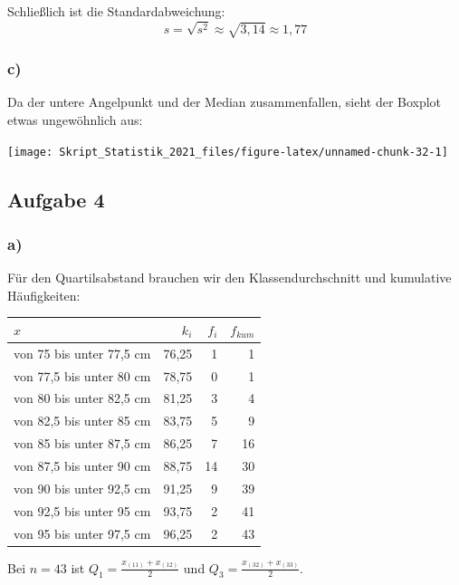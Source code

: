 \documentclass[
  11pt,
  ngerman,
  a4paper,
]{report}
\begin{document}
Schließlich ist die Standardabweichung: \[s=\sqrt{s^2}\approx\sqrt{3,14}\approx1,77\]

\hypertarget{c-4}{%
\subsubsection{c)}\label{c-4}}

Da der untere Angelpunkt und der Median zusammenfallen, sieht der Boxplot etwas ungewöhnlich aus:

\begin{center}\texttt{[image: Skript\_Statistik\_2021\_files/figure-latex/unnamed-chunk-32-1]} \end{center}

\hypertarget{aufgabe-4-3}{%
\subsection{Aufgabe 4}\label{aufgabe-4-3}}

\hypertarget{a-5}{%
\subsubsection{a)}\label{a-5}}

Für den Quartilsabstand brauchen wir den Klassendurchschnitt und kumulative Häufigkeiten:

\begin{table}[H]
\centering
\begin{tabular}{lrrr}
\toprule
$x$ & $k_i$ & $f_i$ & $f_{kum}$\\
\midrule
von 75 bis unter 77,5 cm & 76,25 & 1 & 1\\
von 77,5 bis unter 80 cm & 78,75 & 0 & 1\\
von 80 bis unter 82,5 cm & 81,25 & 3 & 4\\
von 82,5 bis unter 85 cm & 83,75 & 5 & 9\\
von 85 bis unter 87,5 cm & 86,25 & 7 & 16\\
von 87,5 bis unter 90 cm & 88,75 & 14 & 30\\
von 90 bis unter 92,5 cm & 91,25 & 9 & 39\\
von 92,5 bis unter 95 cm & 93,75 & 2 & 41\\
von 95 bis unter 97,5 cm & 96,25 & 2 & 43\\
\bottomrule
\end{tabular}
\end{table}

Bei \(n=43\) ist \(Q_1=\frac{x_{(11)}+x_{(12)}}{2}\) und \(Q_3=\frac{x_{(32)}+x_{(33)}}{2}\).
\end{document}
